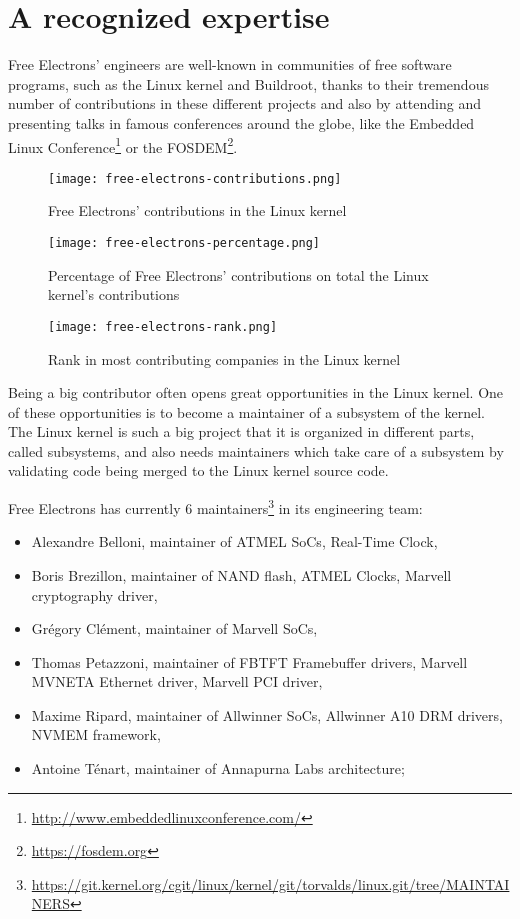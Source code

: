 \section{A recognized expertise}
Free Electrons' engineers are well-known in communities of free software programs, such as the Linux kernel and Buildroot, thanks to their tremendous number of contributions in these different projects and also by attending and presenting talks in famous conferences around the globe, like the Embedded Linux Conference\footnote{\url{http://www.embeddedlinuxconference.com/}} or the FOSDEM\footnote{\url{https://fosdem.org}}.

\begin{figure}[H]
  \texttt{[image: free-electrons-contributions.png]}
  \caption{Free Electrons' contributions in the Linux kernel}
\end{figure}
\begin{figure}[H]
  \texttt{[image: free-electrons-percentage.png]}
  \caption{Percentage of Free Electrons' contributions on total the Linux kernel's contributions}
\end{figure}
\begin{figure}[H]
  \texttt{[image: free-electrons-rank.png]}
  \caption{Rank in most contributing companies in the Linux kernel}
\end{figure}

Being a big contributor often opens great opportunities in the Linux kernel. One of these opportunities is to become a maintainer of a subsystem of the kernel. The Linux kernel is such a big project that it is organized in different parts, called subsystems, and also needs maintainers which take care of a subsystem by validating code being merged to the Linux kernel source code.

Free Electrons has currently 6 maintainers\footnote{\url{https://git.kernel.org/cgit/linux/kernel/git/torvalds/linux.git/tree/MAINTAINERS}} in its engineering team:
\begin{itemize}
\item Alexandre Belloni, maintainer of ATMEL SoCs, Real-Time Clock,
\item Boris Brezillon, maintainer of NAND flash, ATMEL Clocks, Marvell cryptography driver,
\item Grégory Clément, maintainer of Marvell SoCs,
\item Thomas Petazzoni, maintainer of FBTFT Framebuffer drivers, Marvell MVNETA Ethernet driver, Marvell PCI driver,
\item Maxime Ripard, maintainer of Allwinner SoCs, Allwinner A10 DRM drivers, NVMEM framework,
\item Antoine Ténart, maintainer of Annapurna Labs architecture;
\end{itemize}

